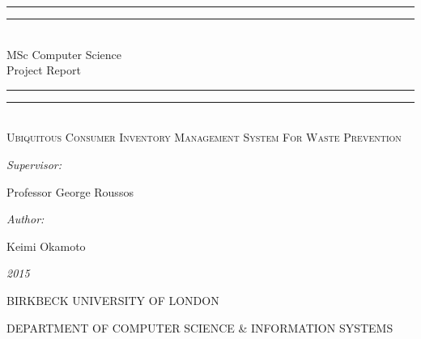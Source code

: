 \documentclass[a4paper, 11pt]{article}
\newlength{\drop}
\begin{document}
  \begin{titlepage}
	\thispagestyle{empty}
    \textheight
    \centering
    \vspace*{\baselineskip}
    \rule{\textwidth}{1.6pt}\vspace*{-\baselineskip}\vspace*{2pt}
    \rule{\textwidth}{0.4pt}\\[\baselineskip]
    {\Large{MSc Computer Science\\[0.3\baselineskip] }} 	
    {\huge{Project Report\\[0.3\baselineskip] }}
	
    \rule{\textwidth}{0.4pt}\vspace*{-\baselineskip}\vspace{3.2pt}
    \rule{\textwidth}{1.6pt}
    \\[\baselineskip]
    \scshape
    {\Large Ubiquitous Consumer Inventory Management System For Waste Prevention\\}
    \vspace*{2\baselineskip}
    {\normalsize\emph{Supervisor: }{\large Professor George Roussos\par}}
    {\normalsize\emph{Author: }{\large Keimi Okamoto\par}}
    
    {\itshape 2015}
    \vfill
    {\large BIRKBECK UNIVERSITY OF LONDON\par}
{\footnotesize DEPARTMENT OF COMPUTER SCIENCE \& INFORMATION SYSTEMS}\par
  \end{titlepage}
  

\tableofcontents
\clearpage

\clearpage




\pagestyle{fancy}
\renewcommand{\sectionmark}[1]{\markboth{#1}{}}
\fancyhf{} %
\renewcommand{\headrulewidth}{0pt}
\setlength{\footskip}{80pt}
\lhead{}
\chead{}
\cfoot{\fancyplain{}{\leftmark }} 
\end{document}
